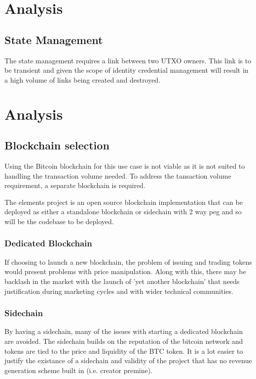\documentclass[10pt,a4paper]{runcrypto}
\begin{document}
\section{Analysis}

\subsection{State Management}
The state management requires a link between two UTXO owners. This link is to be transient and given the scope of identity credential management will result in a high volume of links being created and destroyed.

\section{Analysis}

\subsection{Blockchain selection}

Using the Bitcoin blockchain for this use case is not viable as it is not suited to handling the transaction volume needed. To address the tansaction volume requirement, a separate blockchain is required.

The elements project is an open source blockchain implementation that can be deployed as either a standalone blockchain or sidechain with 2 way peg and so will be the codebase to be deployed.

\subsubsection{Dedicated Blockchain}

If choosing to launch a new blockchain, the problem of issuing and trading tokens would present problems with price manipulation. Along with this, there may be backlash in the market with the launch of 'yet another blockchain' that needs justification during marketing cycles and with wider technical communities.

\subsubsection{Sidechain}

By having a sidechain, many of the issues with starting a dedicated blockchain are avoided. The sidechain builds on the reputation of the bitcoin network and tokens are tied to the price and liquidity of the BTC token. It is a lot easier to justify the existance of a sidechain and validity of the project that has no revenue generation scheme built in (i.e. creator premine).
\end{document}
